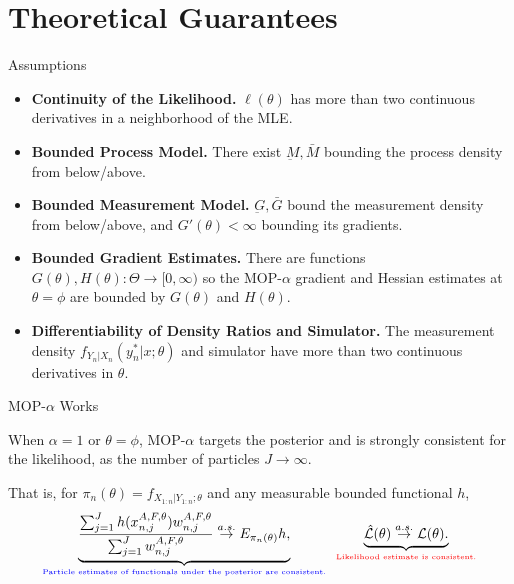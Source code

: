 \documentclass{beamer}
\begin{document}
\section{Theoretical Guarantees}

\begin{frame}{Assumptions}
    
\begin{itemize}
    \item \textbf{Continuity of the Likelihood.} $\ell(\theta)$ has more than two continuous derivatives in a neighborhood of the MLE.
    \pause
    \item \textbf{Bounded Process Model.} There exist $\underbar{M}, \bar{M}$ bounding the process density from below/above.
    \pause
    \item \textbf{Bounded Measurement Model.} $\underbar{G}, \bar{G}$ bound the measurement density from below/above, and $G'(\theta)<\infty$ bounding its gradients.
    \pause
    \item \textbf{Bounded Gradient Estimates.} There are functions $G(\theta), H(\theta): \Theta \to [0,\infty)$ so the MOP-$\alpha$ gradient and Hessian estimates at $\theta=\phi$ are bounded by $G(\theta)$ and $H(\theta)$.
    \pause
    \item \textbf{Differentiability of Density Ratios and Simulator.} The measurement density $f_{Y_n|X_n}(y_n^*|x; \theta)$ and simulator have more than two continuous derivatives in $\theta$.
\end{itemize}
\end{frame}

\begin{frame}{MOP-$\alpha$ Works}
    \begin{thm}
    \label{thm:mop-targeting}
    When $\alpha=1$ or $\theta=\phi$, MOP-$\alpha$ targets the posterior and is strongly consistent for the likelihood, as the number of particles $J \to \infty$.
    
    \pause
    That is, for $\pi_n(\theta)=f_{X_{1:n}|Y_{1:n} ; \theta}$ and any measurable bounded functional $h$, 
    \pause
    \begin{equation}
        \underbrace{\frac{\sum_{j=1}^J h(x_{n,j}^{A,F, \theta}) w_{n,j}^{A,F,\theta}}{\sum_{j=1}^J w_{n,j}^{A,F,\theta}} \stackrel{a.s.}{\to} E_{\pi_n(\theta)} h,}_{\textcolor{blue}{\text{\tiny{Particle estimates of functionals under the posterior are consistent.}}}} \;\; \underbrace{\hat{\mathcal{L}}(\theta)  \stackrel{a.s.}{\to} \mathcal{L}(\theta).}_{\textcolor{red}{\text{\tiny{Likelihood estimate is consistent.}}}}
    \end{equation}
\end{thm}
\end{frame}
\end{document}
